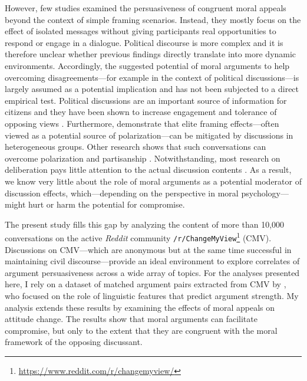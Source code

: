 However, few studies examined the persuasiveness of congruent moral appeals beyond the context of simple framing scenarios. Instead, they mostly focus on the effect of isolated messages without giving participants real opportunities to respond or engage in a dialogue. Political discourse is more complex and it is therefore unclear whether previous findings directly translate into more dynamic environments. Accordingly, the suggested potential of moral arguments to help overcoming disagreements---for example in the context of political discussions---is largely assumed as a potential implication and has not been subjected to a direct empirical test. Political discussions are an important source of information for citizens \citep{huckfeldt1995political} and they have been shown to increase engagement and tolerance of opposing views \citep{mutz2002cross}. Furthermore, \citet{druckman2003framing} demonstrate that elite framing effects---often viewed as a potential source of polarization---can be mitigated by discussions in heterogeneous groups. Other research shows that such conversations can overcome polarization and partisanship \citep{klar2014partisanship}. Notwithstanding, most research on deliberation pays little attention to the actual discussion contents \citep[see][for notable exceptions]{barabas2004deliberation,karpowitz2012gender,mendelberg2014gender}. As a result, we know very little about the role of moral arguments as a potential moderator of discussion effects, which---depending on the perspective in moral psychology---might hurt or harm the potential for compromise. 

The present study fills this gap by analyzing the content of more than 10,000 conversations on the active \textit{Reddit} community \texttt{/r/ChangeMyView}\footnote{\url{https://www.reddit.com/r/changemyview/}} (CMV). Discussions on CMV---which are anonymous but at the same time successful in maintaining civil discourse---provide an ideal environment to explore correlates of argument persuasiveness across a wide array of topics. For the analyses presented here, I rely on a dataset of matched argument pairs extracted from CMV by \citet{tan2016winning}, who focused on the role of linguistic features that predict argument strength. My analysis extends these results by examining the effects of moral appeals on attitude change. The results show that moral arguments can facilitate compromise, but only to the extent that they are congruent with the moral framework of the opposing discussant.





